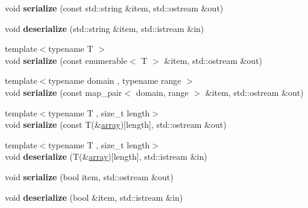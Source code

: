 \begin{DoxyCompactItemize}
\item 
\hypertarget{namespacedlib_a26ecdaff21c62bd613f3e60e2f957cdf}{
void {\bfseries serialize} (const std::string \&item, std::ostream \&out)}
\label{namespacedlib_a26ecdaff21c62bd613f3e60e2f957cdf}

\item 
\hypertarget{namespacedlib_a3d181320a2ea2281013627f0dd45f78a}{
void {\bfseries deserialize} (std::string \&item, std::istream \&in)}
\label{namespacedlib_a3d181320a2ea2281013627f0dd45f78a}

\item 
\hypertarget{namespacedlib_ae375af950cbedb6ea620a360dbbde14c}{
{\footnotesize template$<$typename T $>$ }\\void {\bfseries serialize} (const enumerable$<$ T $>$ \&item, std::ostream \&out)}
\label{namespacedlib_ae375af950cbedb6ea620a360dbbde14c}

\item 
\hypertarget{namespacedlib_aabd16ce881f3b10e3114a9ee4d36eb53}{
{\footnotesize template$<$typename domain , typename range $>$ }\\void {\bfseries serialize} (const map\_\-pair$<$ domain, range $>$ \&item, std::ostream \&out)}
\label{namespacedlib_aabd16ce881f3b10e3114a9ee4d36eb53}

\item 
\hypertarget{namespacedlib_a30ba61778b439901187e9861f4697ea4}{
{\footnotesize template$<$typename T , size\_\-t length$>$ }\\void {\bfseries serialize} (const T(\&\hyperlink{classdlib_1_1array}{array})\mbox{[}length\mbox{]}, std::ostream \&out)}
\label{namespacedlib_a30ba61778b439901187e9861f4697ea4}

\item 
\hypertarget{namespacedlib_a2d2257002446a71b34e2ca9ee8951056}{
{\footnotesize template$<$typename T , size\_\-t length$>$ }\\void {\bfseries deserialize} (T(\&\hyperlink{classdlib_1_1array}{array})\mbox{[}length\mbox{]}, std::istream \&in)}
\label{namespacedlib_a2d2257002446a71b34e2ca9ee8951056}

\item 
\hypertarget{namespacedlib_a76bce1d897763e63ec3e3cae29bfe3e3}{
void {\bfseries serialize} (bool item, std::ostream \&out)}
\label{namespacedlib_a76bce1d897763e63ec3e3cae29bfe3e3}

\item 
\hypertarget{namespacedlib_a088fe6787c9d6685e26a1d44564fd76c}{
void {\bfseries deserialize} (bool \&item, std::istream \&in)}
\label{namespacedlib_a088fe6787c9d6685e26a1d44564fd76c}


\end{DoxyCompactItemize}

